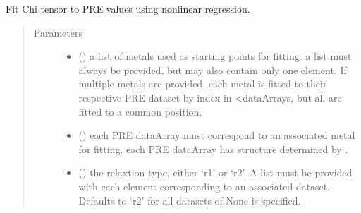 \documentclass[a4paper,10pt,english,openany,oneside]{sphinxmanual}
\begin{document}
\begin{fulllineitems}
\label{\detokenize{reference/generated/paramagpy.fit.nlr_fit_metal_from_pre:paramagpy.fit.nlr_fit_metal_from_pre}}
\sphinxAtStartPar
Fit Chi tensor to PRE values using non\sphinxhyphen{}linear regression.
\begin{quote}\begin{description}
\item[{Parameters}] \leavevmode\begin{itemize}
\item {} 
\sphinxAtStartPar
{} () \textendash{} a list of metals used as starting points for fitting.
a list must always be provided, but may also contain
only one element. If multiple metals are provided, each metal
is fitted to their respective PRE dataset by index in \textless{}dataArrays,
but all are fitted to a common position.

\item {} 
\sphinxAtStartPar
{} () \textendash{} each PRE dataArray must correspond to an associated metal for fitting.
each PRE dataArray has structure determined by
{\hyperref[\detokenize{reference/generated/paramagpy.protein.CustomStructure.parse:paramagpy.protein.CustomStructure.parse}]{}}.

\item {} 
\sphinxAtStartPar
{} (\sphinxstyleliteralemphasis{\sphinxupquote{, }}) \textendash{} the relaxtion type, either ‘r1’ or ‘r2’. A list must be provided with
each element corresponding to an associated dataset.
Defaults to ‘r2’ for all datasets of None is specified.


\end{itemize}
\end{description}
\end{quote}
\end{fulllineitems}
\end{document}
